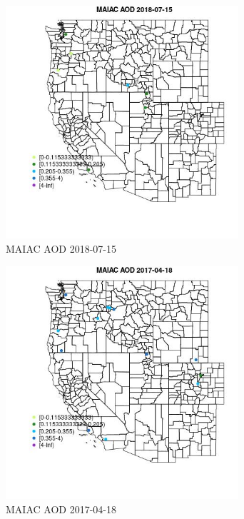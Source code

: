 \begin{figure} 
\centering  
\includegraphics[width=0.77\textwidth]{Code_Outputs/Report_ML_input_PM25_Step4_part_e_de_duplicated_aveswNAs_MapObsMAIAC_AOD2018-07-15.jpg} 
\caption{\label{fig:Report_ML_input_PM25_Step4_part_e_de_duplicated_aveswNAsMapObsMAIAC_AOD2018-07-15}MAIAC AOD 2018-07-15} 
\end{figure} 
 

\begin{figure} 
\centering  
\includegraphics[width=0.77\textwidth]{Code_Outputs/Report_ML_input_PM25_Step4_part_e_de_duplicated_aveswNAs_MapObsMAIAC_AOD2017-04-18.jpg} 
\caption{\label{fig:Report_ML_input_PM25_Step4_part_e_de_duplicated_aveswNAsMapObsMAIAC_AOD2017-04-18}MAIAC AOD 2017-04-18} 
\end{figure} 
 

